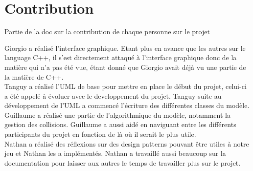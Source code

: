 \section{Contribution}
Partie de la doc sur la contribution de chaque personne sur le projet

Giorgio a réalisé l'interface graphique. Etant plus en avance que les autres sur le language C++, il s'est directement attaqué à l'interface graphique donc de la matière qui n'a pas été vue, étant donné que Giorgio avait déjà vu une partie de la matière de C++.
\\

Tanguy a réalisé  l'UML de base pour mettre en place le début du projet, celui-ci a été appelé à évoluer avec le developpement du projet. Tanguy suite au développement de l'UML a commencé l'écriture des différentes classes du modèle.\\

Guillaume a réalisé une partie de l'algorithmique du modèle, notamment la gestion des collisions. Guillaume a aussi aidé en naviguant entre les différents participants du projet en fonction de là où il serait le plus utile.\\

Nathan a réalisé des réflexions sur des design patterns pouvant être utiles à notre jeu et Nathan les a implémentés. Nathan a travaillé aussi beaucoup sur la documentation pour laisser aux autres le temps de travailler plus sur le projet.\\
